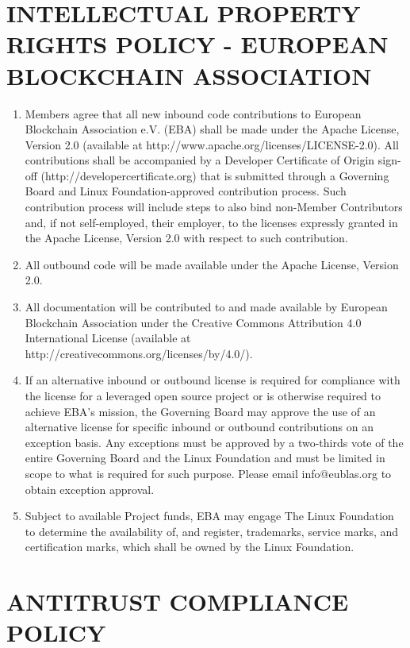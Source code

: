 \documentclass{article}
\begin{document}
\newpage

\section{INTELLECTUAL PROPERTY RIGHTS POLICY - EUROPEAN BLOCKCHAIN ASSOCIATION}

\begin{enumerate}
	\item Members agree that all new inbound code contributions to European Blockchain Association e.V. (EBA) shall be made under the Apache License, Version 2.0 (available at http://www.apache.org/licenses/LICENSE-2.0).
	 All contributions shall be accompanied by a Developer Certificate of Origin sign-off (http://developercertificate.org) that is submitted through a Governing Board and Linux Foundation-approved contribution process. 
	 Such contribution process will include steps to also bind non-Member Contributors and, if not self-employed, their employer, to the licenses expressly granted in the Apache License, Version 2.0 with respect to such contribution.
	 \item All outbound code will be made available under the Apache License, Version 2.0.
	 \item All documentation will be contributed to and made available by European Blockchain Association under the Creative Commons Attribution 4.0 International License (available at http://creativecommons.org/licenses/by/4.0/).
	 \item If an alternative inbound or outbound license is required for compliance with the license for a leveraged open source project or is otherwise required to achieve EBA's mission, the Governing Board may approve the use of an alternative license for specific inbound or outbound contributions on an exception basis. 
	 Any exceptions must be approved by a two-thirds vote of the entire Governing Board and the Linux Foundation and must be limited in scope to what is required for such purpose.
	  Please email info@eublas.org to obtain exception approval.
	  \item Subject to available Project funds, EBA may engage The Linux Foundation to determine the availability of, and register, trademarks, service marks, and certification marks, which shall be owned by the Linux Foundation.
\end{enumerate} 

\newpage

\section{ANTITRUST COMPLIANCE POLICY}
\end{document}
